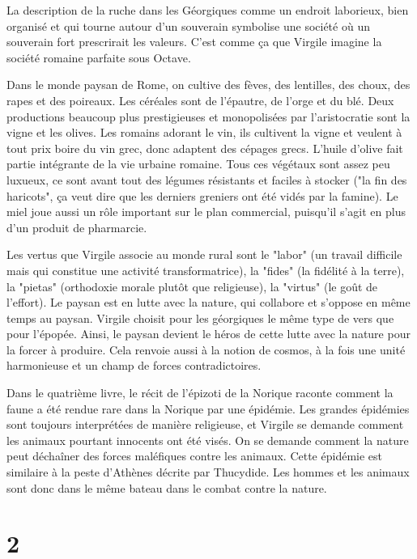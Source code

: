 \documentclass[a4paper,12pt]{book}
\begin{document}
\par La description de la ruche dans les Géorgiques comme un endroit laborieux, bien organisé et qui tourne autour d'un souverain symbolise une société où un souverain fort prescrirait les valeurs. C'est comme ça que Virgile imagine la société romaine parfaite sous Octave.
\par Dans le monde paysan de Rome, on cultive des fèves, des lentilles, des choux, des rapes et des poireaux. Les céréales sont de l'épautre, de l'orge et du blé. Deux productions beaucoup plus prestigieuses et monopolisées par l'aristocratie sont la vigne et les olives. Les romains adorant le vin, ils cultivent la vigne et veulent à tout prix boire du vin grec, donc adaptent des cépages grecs. L'huile d'olive fait partie intégrante de la vie urbaine romaine. Tous ces végétaux sont assez peu luxueux, ce sont avant tout des légumes résistants et faciles à stocker ("la fin des haricots", ça veut dire que les derniers greniers ont été vidés par la famine). Le miel joue aussi un rôle important sur le plan commercial, puisqu'il s'agit en plus d'un produit de pharmarcie.
\par Les vertus que Virgile associe au monde rural sont le "labor" (un travail difficile mais qui constitue une activité transformatrice), la "fides" (la fidélité à la terre), la "pietas" (orthodoxie morale plutôt que religieuse), la "virtus" (le goût de l'effort). Le paysan est en lutte avec la nature, qui collabore et s'oppose en même temps au paysan. Virgile choisit pour les géorgiques le même type de vers que pour l'épopée. Ainsi, le paysan devient le héros de cette lutte avec la nature pour la forcer à produire. Cela renvoie aussi à la notion de cosmos, à la fois une unité harmonieuse et un champ de forces contradictoires.
\par Dans le quatrième livre, le récit de l'épizoti de la Norique raconte comment la faune a été rendue rare dans la Norique par une épidémie. Les grandes épidémies sont toujours interprétées de manière religieuse, et Virgile se demande comment les animaux pourtant innocents ont été visés. On se demande comment la nature peut déchaîner des forces maléfiques contre les animaux. Cette épidémie est similaire à la peste d'Athènes décrite par Thucydide. Les hommes et les animaux sont donc dans le même bateau dans le combat contre la nature.

\section{2}
\end{document}
